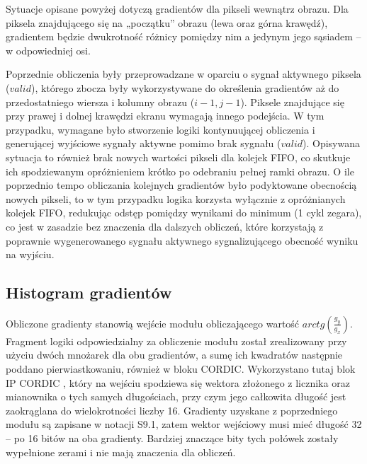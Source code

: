 Sytuacje opisane powyżej dotyczą gradientów dla pikseli wewnątrz obrazu. 
Dla piksela znajdującego się na „początku” obrazu (lewa oraz górna krawędź), gradientem będzie dwukrotność różnicy pomiędzy nim a jedynym jego sąsiadem -- w odpowiedniej osi. %

Poprzednie obliczenia były przeprowadzane w oparciu o sygnał aktywnego piksela ($valid$), którego zbocza były wykorzystywane do określenia gradientów aż do przedostatniego wiersza i kolumny obrazu ($i-1, j-1$). %
Piksele znajdujące się przy prawej i dolnej krawędzi ekranu wymagają innego podejścia. 
W tym przypadku, wymagane było stworzenie logiki kontynuującej obliczenia i generującej wyjściowe sygnały aktywne pomimo brak sygnału ($valid$). 
Opisywana sytuacja to również brak nowych wartości pikseli dla kolejek FIFO, co skutkuje ich spodziewanym opróżnieniem krótko po odebraniu pełnej ramki obrazu.
O ile poprzednio tempo obliczania kolejnych gradientów było podyktowane obecnością nowych pikseli, to w tym przypadku logika korzysta wyłącznie z opróżnianych kolejek FIFO, redukując odstęp pomiędzy wynikami do minimum (1 cykl zegara), co jest w zasadzie bez znaczenia dla dalszych obliczeń, które korzystają z poprawnie wygenerowanego sygnału aktywnego sygnalizującego obecność wyniku na wyjściu.



\subsection{Histogram gradientów}

Obliczone gradienty stanowią wejście modułu obliczającego wartość $arctg(\frac{g_y}{g_x})$. %
Fragment logiki odpowiedzialny za obliczenie modułu został zrealizowany przy użyciu dwóch mnożarek dla obu gradientów, a sumę ich kwadratów następnie poddano pierwiastkowaniu, również w bloku CORDIC. %
Wykorzystano tutaj blok IP CORDIC \cite{CORDIC}, który na wejściu spodziewa się wektora złożonego z licznika oraz mianownika o tych samych długościach, przy czym jego całkowita długość jest zaokrąglana do wielokrotności liczby 16. 
Gradienty uzyskane z poprzedniego modułu są zapisane w notacji S9.1, zatem wektor wejściowy musi mieć długość 32 -- po 16 bitów na oba gradienty.
Bardziej znaczące bity tych połówek zostały wypełnione zerami i nie mają znaczenia dla obliczeń.
 
